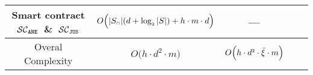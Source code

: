 \begin{table}[!htb]
\begin{center}
{\begin{tabular}{|c|c|c|c|c|}
 \scriptsize Smart contract $\mathcal{SC}_{\mathtt{ANE}}$\ \&\ $\mathcal{SC}_{\mathtt{JUS}}$& \cellcolor{gray!50}\scriptsize $O\Big( |S_{\scriptscriptstyle \cap}|(d+ \log_{\scriptscriptstyle 2} |S|)+h\cdot m\cdot d\Big)$& \cellcolor{gray!50}\scriptsize ---\\
 
   \hline
   
   \hline
   
    
     \scriptsize Overal Complexity & \cellcolor{gray!20}\scriptsize $O\Big(h\cdot d^{2}\cdot m \Big)$& \cellcolor{gray!20}\scriptsize {$O\Big(h\cdot d^{\scriptscriptstyle 2}\cdot \bar\xi\cdot m\Big)$}\\
     
      \cline{1-3}  

\end{tabular} 
} 
\end{center}
\end{table}




